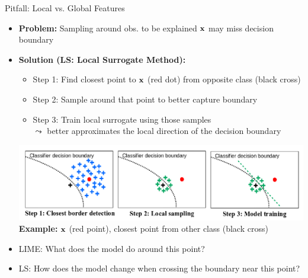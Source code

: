 \documentclass[10pt,compress,t,notes=noshow, xcolor=table]{beamer}
\begin{document}
\begin{frame}{Pitfall: Local vs. Global Features }
		\begin{itemize}
             \item \textbf{Problem:} Sampling around obs. to be explained $\mathbf{x}$ may miss decision boundary
		\item \textbf{Solution (LS: Local Surrogate Method):}
  \begin{itemize}
    \item Step 1: Find closest point to $\mathbf{x}$ (red dot) from opposite class (black cross)
    \item Step 2: Sample around that point to better capture boundary
    \item Step 3: Train local surrogate using those samples\\
		$\leadsto$ better approximates the local direction of the decision boundary 
    \end{itemize}
		\begin{center}
		\includegraphics[width=\linewidth]{figure/laugel_method}
		\scriptsize{\textbf{Example:} $\mathbf{x}$ (red point), closest point from other class (black cross)}
		\end{center}

    \item LIME: What does the model do around this point?
    \item LS: How does the model change when crossing the boundary near this point?
	\end{itemize}


\end{frame}
\end{document}
